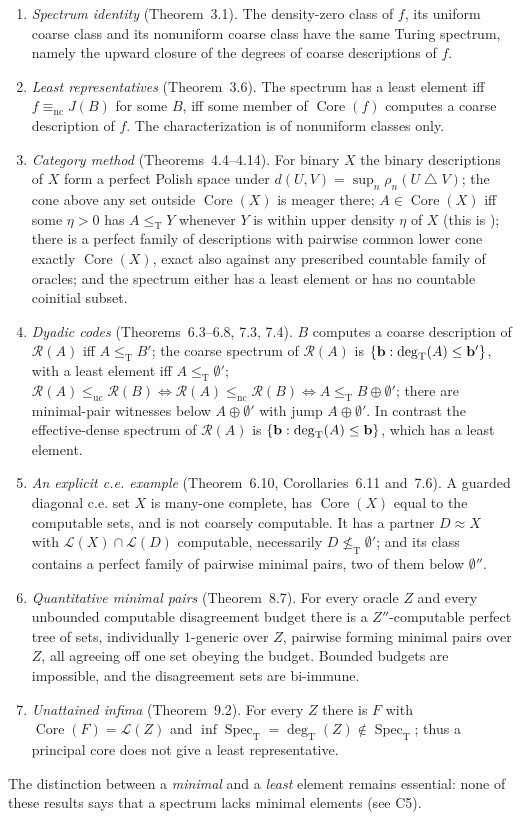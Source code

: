 \documentclass[11pt,a4paper]{article}
\newcommand{\R}{\mathcal R}
\newcommand{\leT}{\leq_{\mathrm T}}
\newcommand{\degT}{\operatorname{deg}_{\mathrm T}}
\newcommand{\Spec}{\operatorname{Spec}_{\mathrm T}}\newcommand{\Up}{\operatorname{Up}}
\newcommand{\Core}{\operatorname{Core}}\newcommand{\Low}{\mathcal L}
\theoremstyle{definition}\newtheorem{definition}[theorem]{Definition}
\theoremstyle{remark}\newtheorem{remark}[theorem]{Remark}
\begin{document}
\begin{enumerate}[label=\textup{(K\arabic*)},leftmargin=3em]
\item \emph{Spectrum identity} (Theorem~3.1). The density-zero class of $f$, its uniform coarse class and its nonuniform coarse class have the same Turing spectrum, namely the upward closure of the degrees of coarse descriptions of $f$.
\item \emph{Least representatives} (Theorem~3.6). The spectrum has a least element iff $f\equiv_{\mathrm{nc}}J(B)$ for some $B$, iff some member of $\Core(f)$ computes a coarse description of $f$. The characterization is of nonuniform classes only.
\item \emph{Category method} (Theorems~4.4--4.14). For binary $X$ the binary descriptions of $X$ form a perfect Polish space under $d(U,V)=\sup_n\rho_n(U\mathbin\triangle V)$; the cone above any set outside $\Core(X)$ is meager there; $A\in\Core(X)$ iff some $\eta>0$ has $A\leT Y$ whenever $Y$ is within upper density $\eta$ of $X$ (this is \cite[Theorem 3.7]{HJKS}); there is a perfect family of descriptions with pairwise common lower cone exactly $\Core(X)$, exact also against any prescribed countable family of oracles; and the spectrum either has a least element or has no countable coinitial subset.
\item \emph{Dyadic codes} (Theorems~6.3--6.8, 7.3, 7.4). $B$ computes a coarse description of $\R(A)$ iff $A\leT B'$; the coarse spectrum of $\R(A)$ is $\{\bdeg:\degT(A)\le\bdeg'\}$, with a least element iff $A\leT\emptyset'$; $\R(A)\le_{\mathrm{uc}}\R(B)\iff\R(A)\le_{\mathrm{nc}}\R(B)\iff A\leT B\oplus\emptyset'$; there are minimal-pair witnesses below $A\oplus\emptyset'$ with jump $A\oplus\emptyset'$. In contrast the effective-dense spectrum of $\R(A)$ is $\{\bdeg:\degT(A)\le\bdeg\}$, which has a least element.
\item \emph{An explicit c.e. example} (Theorem~6.10, Corollaries~6.11 and~7.6). A guarded diagonal c.e. set $X$ is many-one complete, has $\Core(X)$ equal to the computable sets, and is not coarsely computable. It has a partner $D\approx X$ with $\Low(X)\cap\Low(D)$ computable, necessarily $D\nleq_{\mathrm T}\emptyset'$; and its class contains a perfect family of pairwise minimal pairs, two of them below $\emptyset''$.
\item \emph{Quantitative minimal pairs} (Theorem~8.7). For every oracle $Z$ and every unbounded computable disagreement budget there is a $Z''$-computable perfect tree of sets, individually $1$-generic over $Z$, pairwise forming minimal pairs over $Z$, all agreeing off one set obeying the budget. Bounded budgets are impossible, and the disagreement sets are bi-immune.
\item \emph{Unattained infima} (Theorem~9.2). For every $Z$ there is $F$ with $\Core(F)=\Low(Z)$ and $\inf\Spec=\degT(Z)\notin\Spec$; thus a principal core does not give a least representative.
\end{enumerate}
The distinction between a \emph{minimal} and a \emph{least} element remains essential: none of these results says that a spectrum lacks minimal elements (see C5).
\end{document}
